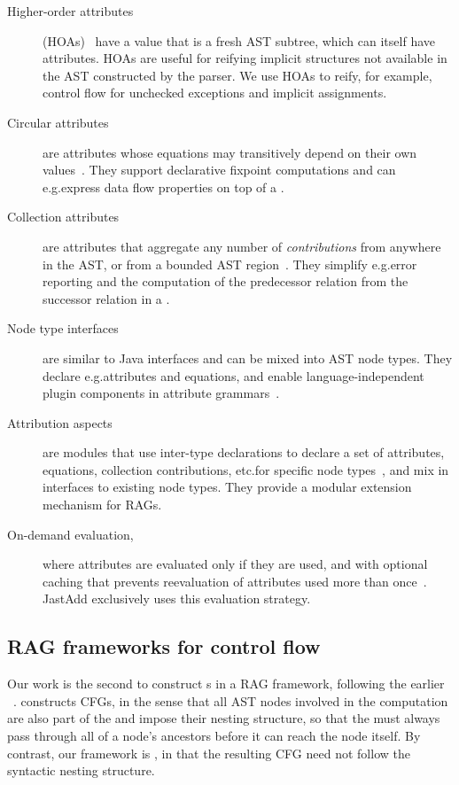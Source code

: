 \begin{description}
\item[Higher-order attributes] (HOAs)~\cite{vogt1989higher} have a value that is a fresh AST subtree, which can itself have attributes.
  HOAs are useful for reifying implicit structures not available in the AST constructed by the parser.
  We use HOAs to reify, for example, control flow for unchecked exceptions and implicit  assignments.
\item[Circular attributes] are attributes whose equations may transitively depend on their own values~\cite{magnusson2007circular}.
  They support declarative fixpoint computations and can e.g.\@ express {data flow} properties on top of a \CFG.
\item[Collection attributes] are attributes that aggregate any number of \emph{contributions} from anywhere in the AST, or from a bounded AST region~\cite{magnusson2007extending}.
  They simplify e.g.\@ error reporting and the computation of the predecessor relation from the successor relation in a \CFG.
\item[Node type interfaces] are similar to Java interfaces and can be mixed into AST node types.
  They declare e.g.\@ attributes and equations,
  and enable language-independent plugin components in attribute grammars~\cite{fors2020patterns}.
\item[Attribution aspects] are modules that use inter-type declarations to declare a set of attributes, equations, collection contributions, etc.\@ for specific node types~\cite{hedin2003jastadd},
  and mix in interfaces to existing node types.
  They provide a modular extension mechanism for RAGs.
\item[On-demand evaluation,] where attributes are evaluated only if they are used, and with optional caching that prevents reevaluation of attributes used more than once~\cite{jourdan84}.
JastAdd exclusively uses this evaluation strategy.
\end{description}

\subsection{RAG frameworks for control flow}

Our work is the second to construct {\CFG}s in a RAG framework, following the earlier {\jastaddjintraflow}~\cite{10.1016/j.scico.2012.02.002}.
{\jastaddjintraflow} constructs \emph{\ParentFirst} CFGs, in the sense that all AST nodes involved in the {\CFG} computation are also part of the {\CFG} and impose their nesting structure, so that the {\CFG} must always pass through all of a node's ancestors before it can reach the node itself.
By contrast, our \intracfg{} framework is \emph{\ASTUnrestricted}, in that the resulting CFG need not follow the syntactic nesting structure.

